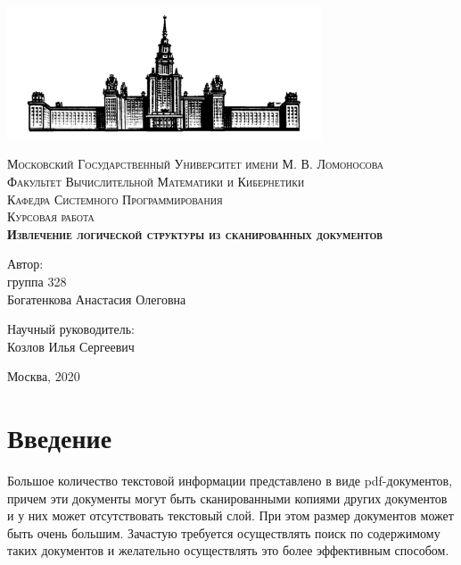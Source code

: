 \documentclass[a4paper,12pt]{article}
\begin{document}
\begin{titlepage}
\begin{center}

\includegraphics[width=0.7\textwidth]{pics/logo.png}

\textsc{\normalsize Московский Государственный Университет имени М. В. Ломоносова}\\
\textsc{\small Факультет Вычислительной Математики и Кибернетики}\\
\textsc{\small Кафедра Системного Программирования}\\[1.5cm]

\textsc{\Large Курсовая работа }\\[0.5cm]
\textsc{ \bf \Large  Извлечение логической структуры из сканированных документов }\\[1.2cm]

\vspace{3cm}
\begin{flushright}
Автор: \\
группа 328 \\
Богатенкова Анастасия Олеговна
\end{flushright}
\begin{flushright}
Научный руководитель: \\
Козлов Илья Сергеевич
\end{flushright}

\vspace{3cm}
{ Москва, 2020}\\[0.2cm]

\vfill

\end{center}
\end{titlepage}

\tableofcontents

\newpage 
\section*{Введение}

Большое количество текстовой информации представлено в виде pdf-документов, причем эти документы могут быть сканированными копиями других документов и у них может отсутствовать текстовый слой. При этом размер документов может быть очень большим. Зачастую требуется осуществлять поиск по содержимому таких документов и желательно осуществлять это более эффективным способом.
\end{document}
